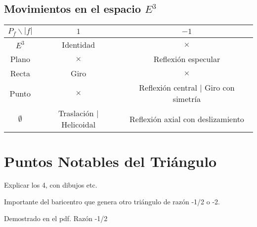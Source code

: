 \subsection{Movimientos en el espacio $E^3$}
\begin{table}[H]
    \centering
    \begin{tabular}{c||c|c}
        $P_f\backslash |f|$ & $1$ & $-1$  \\ \hline \hline
        $E^3$ & Identidad & $\times$ \\
        Plano & $\times$ & Reflexión especular \\
        Recta & Giro & $\times$ \\
        Punto & $\times$ & Reflexión central $\mid$ Giro con simetría \\
        $\emptyset$ & Traslación $\mid$ Helicoidal & Reflexión axial con deslizamiento
    \end{tabular}
\end{table}


\section{Puntos Notables del Triángulo}

Explicar los 4, con dibujos etc.

Importante del baricentro que genera otro triángulo de razón -1/2 o -2.


\begin{teo}[De Euler]
    Demostrado en el pdf. Razón -1/2
\end{teo}